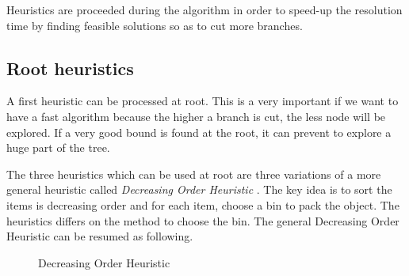 Heuristics are proceeded during the algorithm in order to speed-up the resolution time by finding feasible solutions so as to cut more branches.

\subsection{Root heuristics}
\label{heuristic-root}

A first heuristic can be processed at root. This is a very important if we want to have a fast algorithm because the higher a branch is cut, the less node will be explored. If a very good bound is found at the root, it can prevent to explore a huge part of the tree.

The three heuristics which can be used at root are three variations of a more general heuristic called \textit{Decreasing Order Heuristic} \cite{johnson1973near}. The key idea is to sort the items is decreasing order and for each item, choose a bin to pack the object. The heuristics differs on the method to choose the bin. The general Decreasing Order Heuristic can be resumed as following.

\begin{figure}[!ht]
	\centering
	\begin{minipage}{0.5\linewidth}
		\begin{algorithm}[H]
			\DontPrintSemicolon 
			\SetAlgoLined
			\caption{Decreasing Order Heuristic}
		\end{algorithm}
	\end{minipage}
\end{figure}

